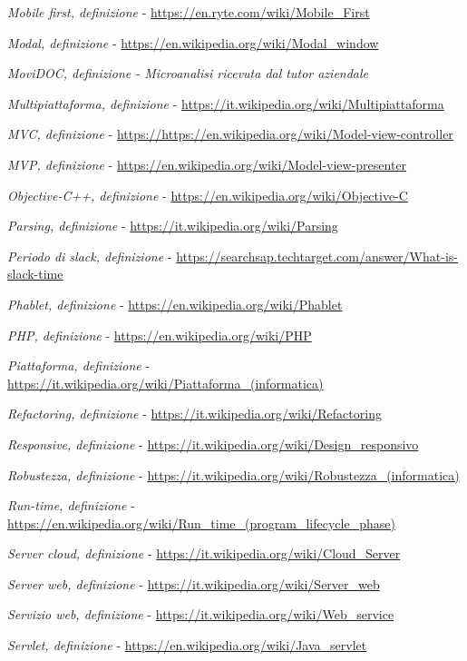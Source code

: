 \begin{enumerate}[label={[\arabic*]}]
	\item \textit{Mobile first, definizione} - \url{https://en.ryte.com/wiki/Mobile_First}
	\item \textit{Modal, definizione} - \url{https://en.wikipedia.org/wiki/Modal_window}
	\item \textit{MoviDOC, definizione - Microanalisi ricevuta dal tutor aziendale}
	\item \textit{Multipiattaforma, definizione} - \url{https://it.wikipedia.org/wiki/Multipiattaforma}
	\item \textit{MVC, definizione} - \url{https://https://en.wikipedia.org/wiki/Model-view-controller}
	\item \textit{MVP, definizione} - \url{https://en.wikipedia.org/wiki/Model-view-presenter}
	\item \textit{Objective-C++, definizione}  - \url{https://en.wikipedia.org/wiki/Objective-C}
	\item \textit{Parsing, definizione} - \url{https://it.wikipedia.org/wiki/Parsing}
	\item \textit{Periodo di slack, definizione} - \url{https://searchsap.techtarget.com/answer/What-is-slack-time}
	\item \textit{Phablet, definizione} - \url{https://en.wikipedia.org/wiki/Phablet}
	\item \textit{PHP, definizione} - \url{https://en.wikipedia.org/wiki/PHP}
	\item \textit{Piattaforma, definizione} - \url{https://it.wikipedia.org/wiki/Piattaforma_(informatica)}
	\item \textit{Refactoring, definizione} - \url{https://it.wikipedia.org/wiki/Refactoring}
	\item \textit{Responsive, definizione} - \url{https://it.wikipedia.org/wiki/Design_responsivo}
	\item \textit{Robustezza, definizione} - \url{https://it.wikipedia.org/wiki/Robustezza_(informatica)}
	\item \textit{Run-time, definizione} - \url{https://en.wikipedia.org/wiki/Run_time_(program_lifecycle_phase)}
	\item \textit{Server cloud, definizione} - \url{https://it.wikipedia.org/wiki/Cloud_Server}
	\item \textit{Server web, definizione} - \url{https://it.wikipedia.org/wiki/Server_web} 
	\item \textit{Servizio web, definizione} - \url{https://it.wikipedia.org/wiki/Web_service} 
	\item \textit{Servlet, definizione} - \url{https://en.wikipedia.org/wiki/Java_servlet}

\end{enumerate}
